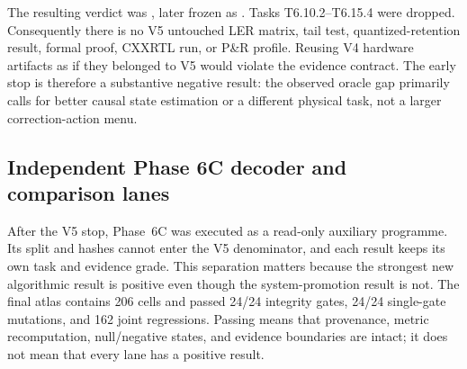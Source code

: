 \documentclass[11pt]{article}
\begin{document}
The resulting verdict was
, later frozen as
.  Tasks T6.10.2--T6.15.4 were
dropped.  Consequently there is no V5 untouched LER matrix, tail test,
quantized-retention result, formal proof, CXXRTL run, or P\&R profile.  Reusing
V4 hardware artifacts as if they belonged to V5 would violate the evidence
contract.  The early stop is therefore a substantive negative result: the
observed oracle gap primarily calls for better causal state estimation or a
different physical task, not a larger correction-action menu.

\subsection{Independent Phase 6C decoder and comparison lanes}

After the V5 stop, Phase~6C was executed as a read-only auxiliary programme.
Its split and hashes cannot enter the V5 denominator, and each result keeps its
own task and evidence grade.  This separation matters because the strongest new
algorithmic result is positive even though the system-promotion result is not.
The final atlas contains 206 cells and passed 24/24 integrity gates, 24/24
single-gate mutations, and 162 joint regressions.  Passing means that provenance,
metric recomputation, null/negative states, and evidence boundaries are intact;
it does not mean that every lane has a positive result.
\end{document}
